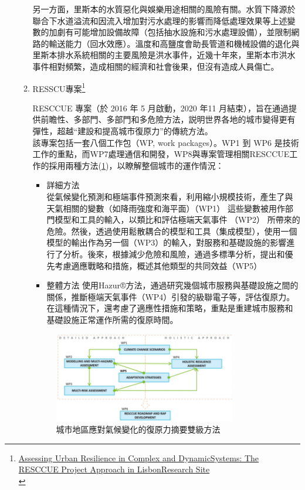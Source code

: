 \documentclass[a4paper,12pt]{article}
\begin{document}
\begin{enumerate}
\begin{enumerate}
另一方面，里斯本的水質惡化與娛樂用途相關的風險有關。水質下降源於聯合下水道溢流和因流入增加對污水處理的影響而降低處理效果等上述變數的加劇有可能增加設備故障（包括抽水設施和污水處理設備），並限制網路的輸送能力（回水效應）。溫度和高鹽度會助長管道和機械設備的退化與里斯本排水系統相關的主要風險是洪水事件，近幾十年來，里斯本市洪水事件相對頻繁，造成相關的經濟和社會後果，但沒有造成人員傷亡。\\
\item RESSCU專案\footnote{\href{https://www.google.com/url?sa=t\&rct=j\&q=\&esrc=s\&source=web\&cd=\&ved=2ahUKEwikleO6gdDvAhW0JaYKHWrkBoIQFjAEegQIAhAD\&url=https\%3A\%2F\%2Fwww.mdpi.com\%2F2071-1050\%2F12\%2F21\%2F8931\%2Fpdf\&usg=AOvVaw1QA1hhOGw26SQiir9XhUi2}{Assessing Urban Resilience in Complex and DynamicSystems: The RESCCUE Project Approach in LisbonResearch Site}\\}
\label{sec:org4b2ee44}

RESCCUE 專案（於 2016 年 5 月啟動，2020 年11 月結束），旨在通過提供前瞻性、多部門、多部門和多危險方法，説明世界各地的城市變得更有彈性，超越``建設和提高城市復原力''的傳統方法。\\

該專案包括一套八個工作包（WP, work packages）。WP1 到 WP6 是技術工作的重點，而WP7處理通信和開發，WP8與專案管理相關RESCCUE工作的採用兩種方法(\ref{fig:Lisbon-WPs})，以瞭解整個城市的運作情況：\\
\begin{itemize}
\item 詳細方法\\
從氣候變化預測和極端事件預測來看，利用縮小規模技術，產生了與天氣相關的變數（如降雨強度和海平面）（WP1） 這些變數被用作部門模型和工具的輸入，以類比和評估極端天氣事件 （WP2） 所帶來的危險。然後，透過使用鬆散耦合的模型和工具（集成模型），使用一個模型的輸出作為另一個（WP3）的輸入，對服務和基礎設施的影響進行了分析。後來，根據減少危險和風險，通過多標準分析，提出和優先考慮適應戰略和措施，概述其他類型的共同效益（WP5）\\
\item 整體方法  使用Hazur®方法，通過研究幾個城市服務與基礎設施之間的關係，推斷極端天氣事件（WP4）引發的級聯電子等，評估復原力。在這種情況下，還考慮了適應性措施和策略，重點是重建城市服務和基礎設施正常運作所需的復原時間。\\
\end{itemize}
\begin{figure}[htbp]
\centering
\includegraphics[width=300]{images/blwp.png}
\caption{\label{fig:Lisbon-WPs}城市地區應對氣候變化的復原力摘要雙級方法}
\end{figure}


\end{enumerate}
\end{enumerate}
\end{document}
